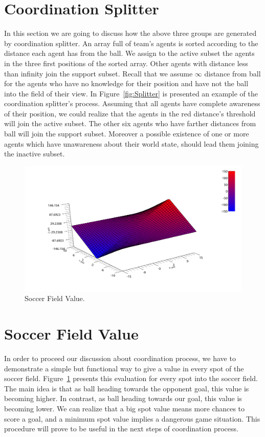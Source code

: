 \section{Coordination Splitter}
In this section we are going to discuss how the above three groups are generated by coordination splitter. An array full of team's agents is sorted according to the distance each agent has from the ball. We assign to the active subset the agents in the three first positions of the sorted array.
Other agents with distance less than infinity join the support subset.
Recall that we assume $\infty$ distance from ball for the agents who have no knowledge for their position and have not the ball into the field of their view.
In Figure~\ref{fig:Splitter} is presented an example of the coordination splitter's process. Assuming that all agents have complete awareness of their position, we could realize that the agents in the red distance's threshold will join the active subset. The other six agents who have farther distances from ball will join the support subset. Moreover a possible existence of one or more agents which have unawareness about their world state, should lead them joining the inactive subset.

\begin{figure}[t!]
\centering
  \includegraphics[width=\textwidth]{Chapter4/figures/Graph1.pdf}
  \caption{Soccer Field Value.} 
  \label{fig:SoccerValue}
\end{figure}



\section{Soccer Field Value}
\label{FieldValue}

In order to proceed our discussion about coordination process, we have to demonstrate a simple but functional way to give a value in every spot of the soccer field. Figure~\ref{fig:SoccerValue} presents this evaluation for every spot into the soccer field. The main idea is that as ball heading towards the opponent goal, this value is becoming higher. In contrast, as ball heading towards our goal, this value is becoming lower. We can realize that a big spot value means more chances to score a goal, and a minimum spot value implies a dangerous game situation. This procedure will prove to be useful in the next steps of coordination process.


